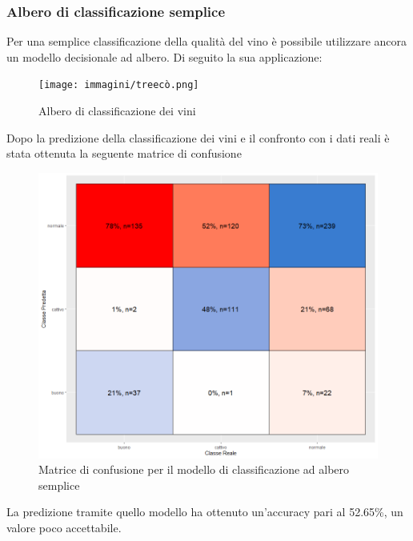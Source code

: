 \documentclass[12pt]{article}
\begin{document}
\subsubsection{Albero di classificazione semplice}
Per una semplice classificazione della qualità del vino è possibile utilizzare ancora un modello decisionale ad albero. Di seguito la sua applicazione:
\begin{figure}[!htb]
    \centering
    \texttt{[image: immagini/treecò.png]}
    \caption{Albero di classificazione dei vini}
\end{figure}
Dopo la predizione della classificazione dei vini e il confronto con i dati reali è stata ottenuta la seguente matrice di confusione
\begin{figure}[!htb]
    \centering
    \includegraphics[width=1\textwidth]{immagini/simpleconf.png}
    \caption{Matrice di confusione per il modello di classificazione ad albero semplice}
\end{figure}
\FloatBarrier
La predizione tramite quello modello ha ottenuto un'accuracy pari al 52.65\%, un valore poco accettabile.
\newpage
\end{document}
